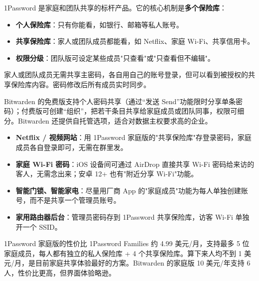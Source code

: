 
1Password 是家庭和团队共享的标杆产品。它的核心机制是\textbf{多个保险库}：

\begin{itemize}
  \item \textbf{个人保险库}：只有你能看，如银行、邮箱等私人账号。
  \item \textbf{共享保险库}：家人或团队成员都能看，如 Netflix、家庭 Wi-Fi、共享信用卡。
  \item \textbf{权限分级}：团队版可设定某些成员"只查看"或"只查看但不编辑"。
\end{itemize}

家人或团队成员无需共享主密码，各自用自己的账号登录，但可以看到被授权的共享保险库内容。密码修改后所有成员实时同步。


Bitwarden 的免费版支持个人密码共享（通过“发送 Send”功能限时分享单条密码）；付费版可创建“组织”，把若干条目共享给家庭成员或团队同事，权限可细分。Bitwarden 还提供自托管选项，适合对数据主权要求高的企业。


\begin{itemize}
  \item \textbf{Netflix / 视频网站}：用 1Password 家庭版的"共享保险库"存登录密码，家庭成员各自登录即可，无需在群里发。
  \item \textbf{家庭 Wi-Fi 密码}：iOS 设备间可通过 AirDrop 直接共享 Wi-Fi 密码给来访的客人，无需念出来；安卓 12+ 也有"附近分享 Wi-Fi"功能。
  \item \textbf{智能门锁、智能家电}：尽量用厂商 App 的"家庭成员"功能为每人单独创建账号，而不是共享一个管理员账号。
  \item \textbf{家用路由器后台}：管理员密码存到 1Password 共享保险库，访客 Wi-Fi 单独开一个 SSID。
\end{itemize}

\begin{tcbinfo}{1Password 家庭版的性价比}
1Password Families 约 4.99 美元/月，支持最多 5 位家庭成员，每人都有独立的私人保险库 + 4 个共享保险库。算下来人均不到 1 美元/月，是目前家庭共享体验最好的方案。Bitwarden 的家庭版 10 美元/年支持 6 人，性价比更高，但界面体验略逊。

\end{tcbinfo}


